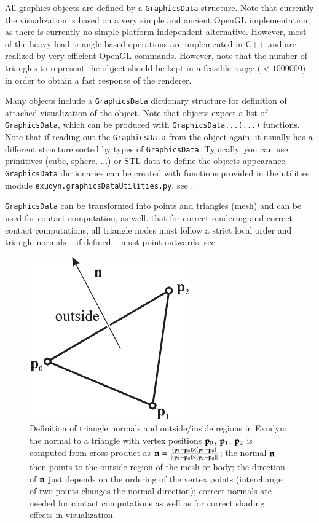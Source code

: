 \label{sec:graphicsData}
All graphics objects are defined by a \texttt{GraphicsData} structure.%
Note that currently the visualization is based on a very simple and ancient OpenGL implementation, as there is currently no simple platform independent alternative. However, most of the heavy load triangle-based operations are implemented in C++ and are realized by very efficient OpenGL commands. However, note that the number of triangles to represent the object should be kept in a feasible range ($<1000000$) in order to obtain a fast response of the renderer.

Many objects include a \texttt{GraphicsData} dictionary structure for definition of attached visualization of the object.
Note that objects expect a list of \texttt{GraphicsData}, which can be produced with \texttt{GraphicsData...(...)} functions. Note that if reading out the \texttt{GraphicsData} from the object again, it usually has a different structure sorted by types of \texttt{GraphicsData}.
Typically, you can use primitives (cube, sphere, ...) or \ac{STL} data to define the objects appearance.
\texttt{GraphicsData} dictionaries can be created with functions provided in the utilities module \texttt{exudyn.graphicsDataUtilities.py}, see .

\texttt{GraphicsData} can be transformed into points and triangles (mesh) and can be used for contact computation, as well.
 that for correct rendering and correct contact computations, all triangle nodes must follow a strict local order and triangle normals -- if defined -- must point outwards, see .
\begin{figure}[tbh]%
\begin{center}
\includegraphics[width=0.25\columnwidth]{figures/triangleNormal}%
\end{center}
\caption{Definition of triangle normals and outside/inside regions in Exudyn: the normal to a triangle with vertex positions $\mathbf{p}_0$, $\mathbf{p}_1$, $\mathbf{p}_2$ is computed from cross product as $\mathbf{n} = \frac{(\mathbf{p}_1-\mathbf{p}_0) \times (\mathbf{p}_2-\mathbf{p}_0)}{|(\mathbf{p}_1-\mathbf{p}_0) \times (\mathbf{p}_2-\mathbf{p}_0)|}$;
the normal $\mathbf{n}$ then points to the outside region of the mesh or body; the direction of $\mathbf{n}$ just depends on the ordering of the vertex points (interchange of two points changes the normal direction); correct normals are needed for contact computations as well as for correct shading effects in visualization.}%
\label{fig:triangleNormals}%
\end{figure}

